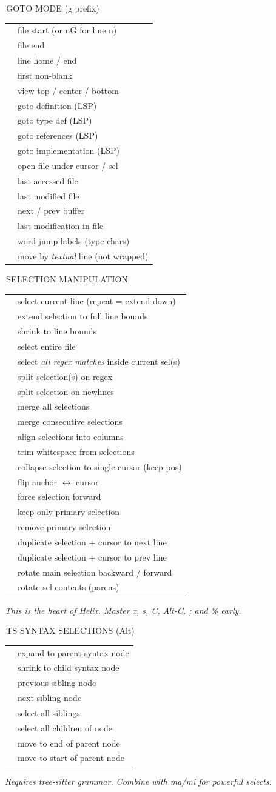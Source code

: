 \documentclass[9pt,a4paper,landscape]{extarticle}
\makeatletter
\newcommand{\kbd}[1]{{\ttfamily\bfseries\footnotesize\color{keyclr}#1}}
\newcommand{\sect}[1]{%
  \vspace{0pt}%
  {\setlength{\fboxsep}{0.5pt}%
   \noindent\colorbox{hdrbg}{\parbox{\dimexpr\columnwidth-1pt\relax}{%
     \color{hdrfg}\bfseries\sffamily\footnotesize\strut\,#1}}}%
  \par\vspace{0pt}}
\newlength{\kdsep}\setlength{\kdsep}{0pt}
\newcommand{\kd}[2]{\kbd{#1} & #2 \\[\kdsep]}
\newenvironment{kt}{%
  \setlength{\tabcolsep}{0pt}%
  \begin{tabular}{@{}>{\footnotesize\raggedright\arraybackslash}p{17mm}@{\hspace{1.5pt}}>{\footnotesize\color{bodyclr}\raggedright\arraybackslash}p{\dimexpr\columnwidth-17mm-1.5pt\relax}@{}}%
}{%
  \end{tabular}\par}
\newcommand{\snote}[1]{{\scriptsize\color{noteclr}\textit{#1}}\vspace{0pt}\par}
\makeatother
\begin{document}
\begin{multicols}{5}
\sect{GOTO MODE (g prefix)}
\begin{kt}
\kd{gg}{file start (or nG for line n)}
\kd{ge}{file end}
\kd{gh / gl}{line home / end}
\kd{gs}{first non-blank}
\kd{gt / gc / gb}{view top / center / bottom}
\kd{gd}{goto definition (LSP)}
\kd{gy}{goto type def (LSP)}
\kd{gr}{goto references (LSP)}
\kd{gi}{goto implementation (LSP)}
\kd{gf}{open file under cursor / sel}
\kd{ga}{last accessed file}
\kd{gm}{last modified file}
\kd{gn / gp}{next / prev buffer}
\kd{g.}{last modification in file}
\kd{gw}{word jump labels (type chars)}
\kd{gj / gk}{move by \textit{textual} line (not wrapped)}
\end{kt}

\sect{SELECTION MANIPULATION}
\begin{kt}
\kd{x}{select current line (repeat = extend down)}
\kd{X}{extend selection to full line bounds}
\kd{Alt-x}{shrink to line bounds}
\kd{\%}{select entire file}
\kd{s}{select \textit{all regex matches} inside current sel(s)}
\kd{S}{split selection(s) on regex}
\kd{Alt-s}{split selection on newlines}
\kd{Alt--}{merge all selections}
\kd{Alt-\_}{merge consecutive selections}
\kd{\&}{align selections into columns}
\kd{\_}{trim whitespace from selections}
\kd{;}{collapse selection to single cursor (keep pos)}
\kd{Alt-;}{flip anchor $\leftrightarrow$ cursor}
\kd{Alt-:}{force selection forward}
\kd{,}{keep only primary selection}
\kd{Alt-,}{remove primary selection}
\kd{C}{duplicate selection + cursor to next line}
\kd{Alt-C}{duplicate selection + cursor to prev line}
\kd{( / )}{rotate main selection backward / forward}
\kd{Alt-(/Alt-)}{rotate sel contents (parens)}
\end{kt}
\snote{This is the heart of Helix. Master x, s, C, Alt-C, ; and \% early.}

\sect{TS SYNTAX SELECTIONS (Alt)}
\begin{kt}
\kd{Alt-o / Alt-Up}{expand to parent syntax node}
\kd{Alt-i / Alt-Down}{shrink to child syntax node}
\kd{Alt-p / Alt-Left}{previous sibling node}
\kd{Alt-n / Alt-Right}{next sibling node}
\kd{Alt-a}{select all siblings}
\kd{Alt-I}{select all children of node}
\kd{Alt-e}{move to end of parent node}
\kd{Alt-b}{move to start of parent node}
\end{kt}
\snote{Requires tree-sitter grammar. Combine with ma/mi for powerful selects.}


\end{multicols}
\end{document}

